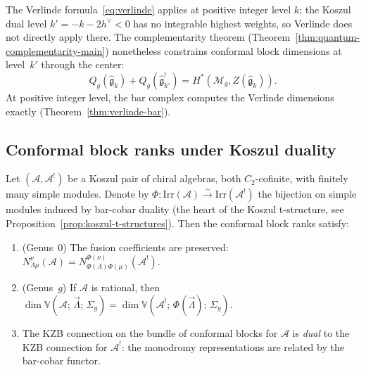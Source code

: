 \begin{remark}
\label{rem:verlinde-koszul}
The Verlinde formula~\eqref{eq:verlinde} applies at positive integer level $k$; the Koszul dual level $k' = -k - 2h^\vee < 0$ has no integrable highest weights, so Verlinde does not directly apply there.  The complementarity theorem (Theorem~\ref{thm:quantum-complementarity-main}) nonetheless constrains conformal block dimensions at level~$k'$ through the center:
\[
Q_g(\widehat{\mathfrak{g}}_k) +
Q_g(\widehat{\mathfrak{g}}_{k'}^!)
= H^*(\mathcal{M}_g, Z(\widehat{\mathfrak{g}}_k)).
\]
At positive integer level, the bar complex computes the Verlinde dimensions exactly (Theorem~\ref{thm:verlinde-bar}).
\end{remark}

\subsection{Conformal block ranks under Koszul duality}
\label{sec:conformal-blocks-kd}

\begin{proposition}
\label{prop:conformal-block-duality}
Let $(\mathcal{A}, \mathcal{A}^!)$ be a Koszul pair of chiral
algebras, both $C_2$-cofinite, with finitely many simple modules.
Denote by
$\Phi\colon \mathrm{Irr}(\mathcal{A})
\xrightarrow{\sim} \mathrm{Irr}(\mathcal{A}^!)$ the bijection
on simple modules induced by bar-cobar duality
\textup{(}the heart of the Koszul t-structure, see
Proposition~\textup{\ref{prop:koszul-t-structures})}.
Then the conformal block ranks satisfy:
\begin{enumerate}[label=\textup{(\roman*)}]
\item \textup{(}Genus~$0$\textup{)} The fusion coefficients are
  preserved: $N_{\Lambda\mu}^{\nu}(\mathcal{A})
  = N_{\Phi(\Lambda)\Phi(\mu)}^{\Phi(\nu)}(\mathcal{A}^!)$.
\item \textup{(}Genus~$g$\textup{)}  If $\mathcal{A}$ is rational,
  then $\dim \mathbb{V}(\mathcal{A};\, \vec{\Lambda};\, \Sigma_g)
  = \dim \mathbb{V}(\mathcal{A}^!;\, \Phi(\vec{\Lambda});\,
  \Sigma_g)$.
\item The KZB connection on the bundle of conformal blocks
  for $\mathcal{A}$ is \emph{dual} to the KZB connection for
  $\mathcal{A}^!$: the monodromy representations are related
  by the bar-cobar functor.
\end{enumerate}
\end{proposition}

